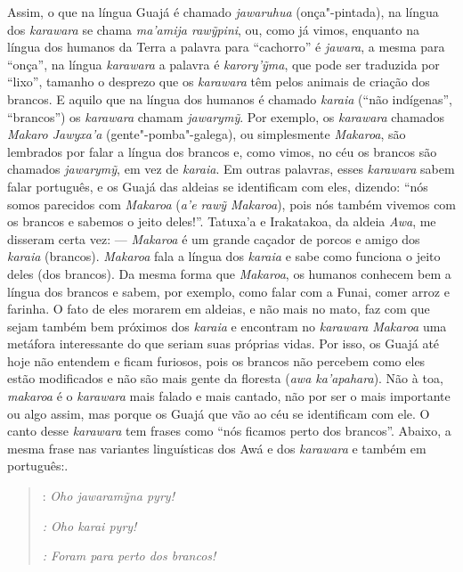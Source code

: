 Assim, o que na língua Guajá é chamado \emph{jawaruhua} (onça"-pintada),
na língua dos \emph{karawara} se chama \emph{ma'amija rawỹpini}, ou,
como já vimos, enquanto na língua dos humanos da Terra a palavra para
``cachorro'' é \emph{jawara}, a mesma para ``onça'', na língua
\emph{karawara} a palavra é \emph{karory'ỹma}, que pode ser traduzida
por ``lixo'', tamanho o desprezo que os \emph{karawara} têm pelos
animais de criação dos brancos. E aquilo que na língua dos humanos é
chamado \emph{karaia} (``não indígenas'', ``brancos'') os
\emph{karawara} chamam \emph{jawarymỹ}. Por exemplo, os \emph{karawara}
chamados \emph{Makaro Jawyxa'a} (gente"-pomba"-galega), ou simplesmente
\emph{Makaroa}, são lembrados por falar a língua dos brancos e, como
vimos, no céu os brancos são chamados \emph{jawarymỹ}, em vez de
\emph{karaia}. Em outras palavras, esses \emph{karawara} sabem falar
português, e os Guajá das aldeias se identificam com eles, dizendo:
``nós somos parecidos com \emph{Makaroa} (\emph{a'e rawỹ Makaroa}), pois
nós também vivemos com os brancos e sabemos o jeito deles!''. Tatuxa'a e
Irakatakoa, da aldeia \emph{Awa}, me disseram certa vez: --- \emph{Makaroa}
é um grande caçador de porcos e amigo dos \emph{karaia} (brancos).
\emph{Makaroa} fala a língua dos \emph{karaia} e sabe como funciona o
jeito deles (dos brancos). Da mesma forma que \emph{Makaroa}, os humanos
conhecem bem a língua dos brancos e sabem, por exemplo, como falar com a
Funai, comer arroz e farinha. O fato de eles morarem em aldeias, e não
mais no mato, faz com que sejam também bem próximos dos \emph{karaia} e
encontram no \emph{karawara} \emph{Makaroa} uma metáfora interessante do
que seriam suas próprias vidas. Por isso, os Guajá até hoje não entendem
e ficam furiosos, pois os brancos não percebem como eles estão
modificados e não são mais gente da floresta (\emph{awa ka'apahara}).
Não à toa, \emph{makaroa} é o \emph{karawara} mais falado e mais
cantado, não por ser o mais importante ou algo assim, mas porque os
Guajá que vão ao céu se identificam com ele. O canto desse
\emph{karawara} tem frases como ``nós ficamos perto dos brancos''.
Abaixo, a mesma frase nas variantes linguísticas dos Awá e dos
\emph{karawara} e também em português:.

\begin{quote}
: \emph{Oho \emph{jawaramỹna} pyry!}

\noindent
\emph{: Oho \emph{karai} pyry!}

\noindent
\emph{: Foram para perto dos \emph{brancos}!}
\end{quote}

